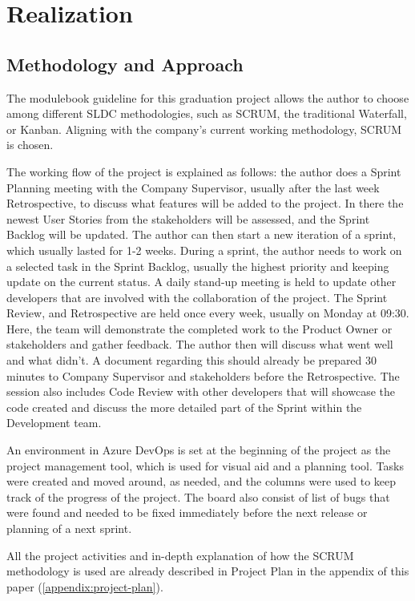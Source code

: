 \chapter{Realization}

\section{Methodology and Approach}

The modulebook guideline for this graduation project allows the author to choose among different SLDC methodologies, such
as SCRUM, the traditional Waterfall, or Kanban. Aligning with the company's current working methodology, SCRUM is chosen.

The working flow of the project is explained as follows: the author does a Sprint Planning meeting with the Company Supervisor, usually after the
last week Retrospective, to discuss
what features will be added to the project. In there the newest User Stories from the stakeholders will be assessed, and the
Sprint Backlog will be updated. The author can then start a new iteration of a sprint, which usually lasted for 1-2 weeks. During a sprint,
the author needs to work on a selected task in the Sprint Backlog, usually the highest priority and keeping update on the current status.
A daily stand-up meeting is held to update other developers that are involved with the collaboration of the project. The Sprint Review,
and Retrospective are held once every week, usually on Monday at 09:30. Here, the team will demonstrate
the completed work to the Product Owner or stakeholders and gather feedback. The author then will discuss what went well and what
didn't. A document regarding this should already be prepared 30 minutes to Company Supervisor and stakeholders before the Retrospective.
The session also includes Code Review with other developers that will showcase the code created and discuss the more detailed part of the
Sprint within the Development team.

An environment in Azure DevOps is set at the beginning of the project as the project management tool, which is used for visual aid
and a planning tool. Tasks were created and moved around, as needed, and the columns were used to keep track of the progress of the
project. The board also consist of list of bugs that were found and needed to be fixed immediately before the next release or planning
of a next sprint.

All the project activities and in-depth explanation of how the SCRUM methodology is used are already described in Project Plan in the appendix of this paper
(\ref{appendix:project-plan}).

